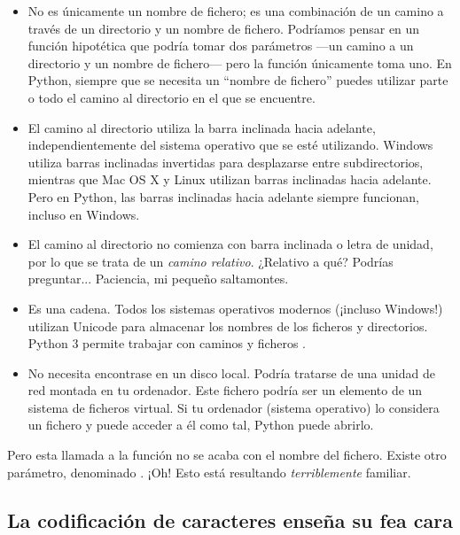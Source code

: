 \begin{itemize}

\item No es únicamente un nombre de fichero; es una combinación de un camino a través de un directorio y un nombre de fichero. Podríamos pensar en un función hipotética que podría tomar dos parámetros ---un camino a un directorio y un nombre de fichero--- pero la función  únicamente toma uno. En Python, siempre que se necesita un ``nombre de fichero'' puedes utilizar parte o todo el camino al directorio en el que se encuentre.

\item El camino al directorio utiliza la barra inclinada hacia adelante, independientemente del sistema operativo que se esté utilizando. Windows utiliza barras inclinadas invertidas para desplazarse entre subdirectorios, mientras que Mac OS X y Linux utilizan barras inclinadas hacia adelante. Pero en Python, las barras inclinadas hacia adelante siempre funcionan, incluso en Windows.

\item El camino al directorio no comienza con barra inclinada o letra de unidad, por lo que se trata de un \emph{camino relativo}. ¿Relativo a qué? Podrías preguntar... Paciencia, mi pequeño saltamontes.

\item Es una cadena. Todos los sistemas operativos modernos (¡incluso Windows!) utilizan Unicode para almacenar los nombres de los ficheros y directorios. Python 3 permite trabajar con caminos y ficheros .

\item No necesita encontrase en un disco local. Podría tratarse de una unidad de red montada en tu ordenador. Este fichero podría ser un elemento de un sistema de ficheros virtual. Si tu ordenador (sistema operativo) lo considera un fichero y puede acceder a él como tal, Python puede abrirlo.

\end{itemize}

Pero esta llamada a la función  no se acaba con el nombre del fichero. Existe otro parámetro, denominado . ¡Oh! Esto está resultando \emph{terriblemente} familiar.

\subsection{La codificación de caracteres enseña su fea cara}

